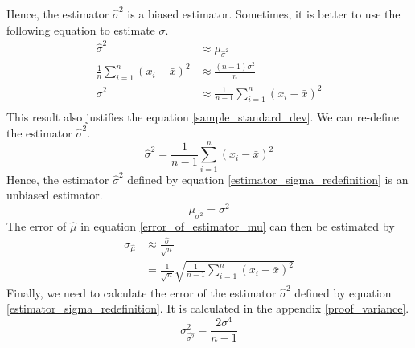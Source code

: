 \documentclass[12pt,a4paper]{report}
\begin{document}
Hence, the estimator $\hat{\sigma}^2$ is a biased estimator. Sometimes, it is better to use the following equation to estimate $\sigma$.
\begin{align*}
\hat{\sigma}^2 &\approx \mu_{\hat{\sigma}^2} \\
\frac{1}{n} \sum_{i = 1}^{n} (x_i - \bar{x})^2 &\approx \frac{(n-1)\sigma^2}{n} \\
\sigma^2 &\approx \frac{1}{n-1} \sum_{i = 1}^{n} (x_i - \bar{x})^2 \\
\end{align*}
This result also justifies the equation \ref{sample_standard_dev}.
We can re-define the estimator $\hat{\sigma}^2$.
\begin{equation} \label{estimator_sigma_redefinition}
\hat{\sigma}^2 = \frac{1}{n-1} \sum_{i = 1}^{n} (x_i - \bar{x})^2
\end{equation}
Hence, the estimator $\hat{\sigma}^2$ defined by equation \ref{estimator_sigma_redefinition} is an unbiased estimator.
\begin{equation*}
\mu_{\hat{\sigma^2}} = \sigma^2
\end{equation*}
The error of $\hat{\mu}$ in equation \ref{error_of_estimator_mu} can then be estimated by
\begin{align*}
\sigma_{\hat{\mu}}
&\approx \frac{\hat{\sigma}}{\sqrt{n}} \\
&= \frac{1}{\sqrt{n}} \sqrt{ \frac{1}{n-1} \sum_{i = 1}^{n} (x_i - \bar{x})^2 }
\end{align*}
Finally, we need to calculate the error of the estimator $\hat{\sigma}^2$ defined by equation \ref{estimator_sigma_redefinition}. It is calculated in the appendix \ref{proof_variance}.
\begin{equation*}
\sigma_{\hat{\sigma^2}}^2 = \frac{2\sigma^4}{n-1}
\end{equation*}
\end{document}
